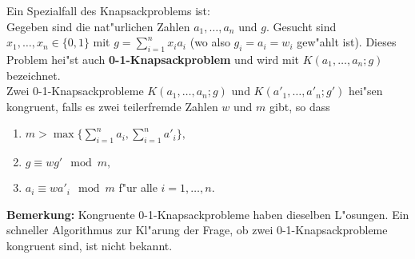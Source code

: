 Ein Spezialfall des Knapsackproblems ist:\\
Gegeben sind die nat"urlichen Zahlen $ a_1, \dots, a_n $   und $ g .$
Gesucht sind  $ x_1, \dots, x_n \in \{ 0,1\} $  mit $ g = \sum_{i=1}^{n}x_i a_i $  (wo also $ g_i = a_i = w_i $ gew"ahlt ist).
Dieses Problem hei"st auch  {\bf 0-1-Knapsackproblem} und wird mit $ K(a_1, \dots, a_n;g) $  bezeichnet.\\

Zwei 0-1-Knapsackprobleme  $ K(a_1, \dots, a_n;g) $   und  $ K(a'_1, \dots, a'_n;g') $  hei"sen kongruent, falls es zwei  teilerfremde Zahlen $ w $ und $ m $ gibt, so dass
\begin{enumerate}
    \item $ m > \max \{ \sum_{i=1}^n a_i , \sum_{i=1}^n a'_i \}, $

    \item $ g \equiv wg' \mod m, $

    \item $ a_i \equiv w a'_i \mod m $ f"ur alle $ i=1, \dots, n.$

\end{enumerate}
 
{\bf Bemerkung:}
Kongruente 0-1-Knapsackprobleme haben dieselben L"osungen.
Ein schneller Algorithmus zur Kl"arung der Frage, ob zwei 0-1-Knapsackprobleme kongruent sind, ist nicht bekannt.

